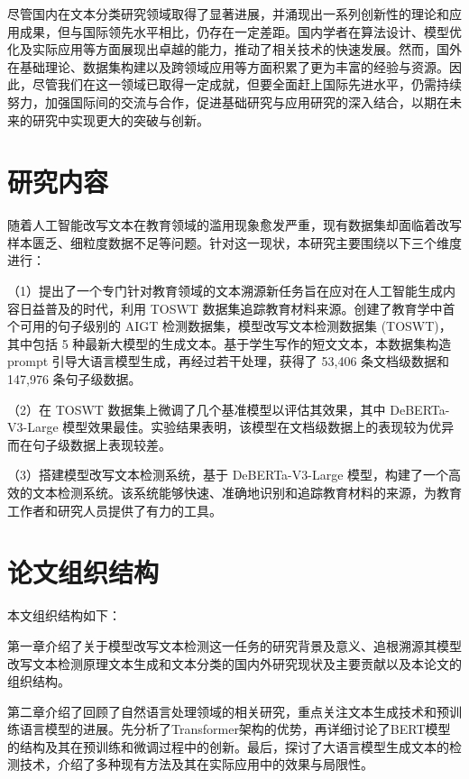 尽管国内在文本分类研究领域取得了显著进展，并涌现出一系列创新性的理论和应用成果，但与国际领先水平相比，仍存在一定差距。国内学者在算法设计、模型优化及实际应用等方面展现出卓越的能力，推动了相关技术的快速发展。然而，国外在基础理论、数据集构建以及跨领域应用等方面积累了更为丰富的经验与资源。因此，尽管我们在这一领域已取得一定成就，但要全面赶上国际先进水平，仍需持续努力，加强国际间的交流与合作，促进基础研究与应用研究的深入结合，以期在未来的研究中实现更大的突破与创新。

\section{研究内容}
\label{sec:intro-contribution}

随着人工智能改写文本在教育领域的滥用现象愈发严重，现有数据集却面临着改写样本匮乏、细粒度数据不足等问题。针对这一现状，本研究主要围绕以下三个维度进行：

（1）提出了一个专门针对教育领域的文本溯源新任务旨在应对在人工智能生成内容日益普及的时代，利用 TOSWT 数据集追踪教育材料来源。创建了教育学中首个可用的句子级别的 AIGT 检测数据集，模型改写文本检测数据集 (TOSWT)，其中包括 5 种最新大模型的生成文本。基于学生写作的短文文本，本数据集构造 prompt 引导大语言模型生成，再经过若干处理，获得了 53,406 条文档级数据和 147,976 条句子级数据。

（2）在 TOSWT 数据集上微调了几个基准模型以评估其效果，其中 DeBERTa-V3-Large 模型效果最佳。实验结果表明，该模型在文档级数据上的表现较为优异而在句子级数据上表现较差。

（3）搭建模型改写文本检测系统，基于 DeBERTa-V3-Large 模型，构建了一个高效的文本检测系统。该系统能够快速、准确地识别和追踪教育材料的来源，为教育工作者和研究人员提供了有力的工具。

\section{论文组织结构}
\label{sec:intro-paperarchitect}

本文组织结构如下：

第一章介绍了关于模型改写文本检测这一任务的研究背景及意义、追根溯源其模型改写文本检测原理文本生成和文本分类的国内外研究现状及主要贡献以及本论文的组织结构。

第二章介绍了回顾了自然语言处理领域的相关研究，重点关注文本生成技术和预训练语言模型的进展。先分析了Transformer架构的优势，再详细讨论了BERT模型的结构及其在预训练和微调过程中的创新。最后，探讨了大语言模型生成文本的检测技术，介绍了多种现有方法及其在实际应用中的效果与局限性。


